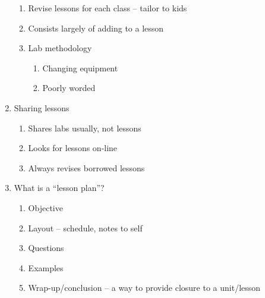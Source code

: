 \begin{enumerate}
\begin{enumerate}
			\item Revise lessons for each class -- tailor to kids
			\item Consists largely of adding to a lesson
			\item Lab methodology
				\begin{enumerate}
					\item Changing equipment
					\item Poorly worded
				\end{enumerate}
		\end{enumerate}
	\item Sharing lessons
		\begin{enumerate}
			\item Shares labs usually, not lessons
			\item Looks for lessons on-line
			\item Always revises borrowed lessons
		\end{enumerate}
	\item What is a ``lesson plan''?
		\begin{enumerate}
			\item Objective
			\item Layout -- schedule, notes to self
			\item Questions
			\item Examples
			\item Wrap-up/conclusion -- a way to provide closure to a
				unit/lesson
		\end{enumerate}
\end{enumerate}

